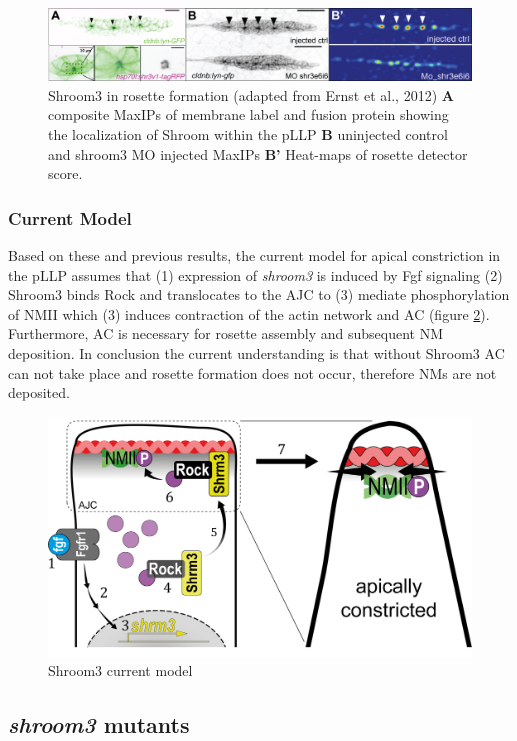 \documentclass[11pt,singlespacinge,twoside]{reedthesis} %
\begin{document}
\begin{figure}

{\centering \includegraphics[width=.95\textwidth]{figures/intro/shrm_ernst} 

}

\caption[Shroom3 in rosette formation]{Shroom3 in rosette formation (adapted from Ernst et al., 2012) \textbf{A} composite MaxIPs of membrane label and fusion protein showing the localization of Shroom within the pLLP \textbf{B} uninjected control and shroom3 MO injected MaxIPs \textbf{B'} Heat-maps of rosette detector score.}\label{fig:shrmernst}
\end{figure}
\hypertarget{current-model}{%
\subsubsection{Current Model}\label{current-model}}

Based on these and previous results, the current model for apical constriction in the pLLP assumes that (1) expression of \emph{shroom3} is induced by Fgf signaling (2) Shroom3 binds Rock and translocates to the AJC to (3) mediate phosphorylation of NMII which (3) induces contraction of the actin network and AC (figure \ref{fig:shrmmodel}). Furthermore, AC is necessary for rosette assembly and subsequent NM deposition. In conclusion the current understanding is that without Shroom3 AC can not take place and rosette formation does not occur, therefore NMs are not deposited.


\begin{figure}

{\centering \includegraphics[width=.5\textwidth]{figures/intro/shrm_model} 

}

\caption{Shroom3 current model}\label{fig:shrmmodel}
\end{figure}
\hypertarget{shroom3-mutants}{%
\subsection{\texorpdfstring{\emph{shroom3} mutants}{shroom3 mutants}}\label{shroom3-mutants}}
\end{document}
